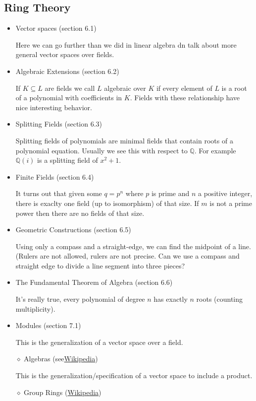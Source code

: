 \documentclass[12pt]{article}
\newcommand{\Q}{\mathbb{Q}}
\begin{document}
	\subsection*{Ring Theory}
	\begin{itemize}
		\item Vector spaces (section 6.1)

			Here we can go further than we did in linear algebra dn talk about more general vector spaces over fields.
		\item Algebraic Extensions (section 6.2)

			If $K\subseteq L$ are fields we call $L$ algebraic over $K$ if every element of $L$ is a root of a polynomial with coefficients in $K$. Fields with these relationship have nice interesting behavior.
		\item Splitting Fields (section 6.3)

			Splitting fields of polynomials are minimal fields that contain roots of a polynomial equation.  Usually we see this with respect to $\Q$.  For example $\Q(i)$ is a splitting field of $x^2+1$.
		\item Finite Fields (section 6.4)

			It turns out that given some $q=p^n$ where $p$ is prime and $n$ a positive integer, there is exaclty one field (up to isomorphism) of that size.  If $m$ is not a prime power then there are no fields of that size.
		\item Geometric Constructions (section 6.5)

			Using only a compass and a straight-edge, we can find the midpoint of a line. (Rulers are not allowed, rulers are not precise.  Can we use a compass and straight edge to divide a line segment into three pieces?
		\item The Fundamental Theorem of Algebra (section 6.6)

			It's really true, every polynomial of degree $n$ has exactly $n$ roots (counting multiplicity).
		\item Modules (section 7.1)

			This is the generalization of a vector space over a field.
		\item[$\diamond$] Algebras (see\href{https://en.wikipedia.org/wiki/Algebra_over_a_field}{Wikipedia})

			This is the generalization/specification of a vector space to include a product.

		\item[$\diamond$] Group Rings (\href{https://en.wikipedia.org/wiki/Group_ring}{Wikipedia})


\end{itemize}
\end{document}
